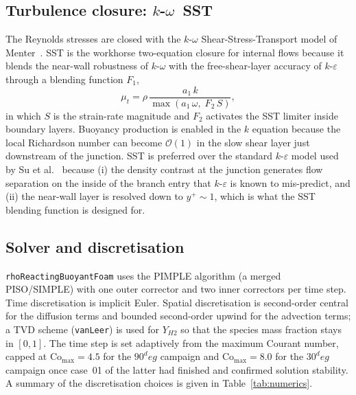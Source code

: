 \documentclass[11pt,a4paper]{article}
\def\Hi{H2}%
\def\circ{ deg}%
\newcommand{\Hi}{\ensuremath{\mathrm{H_2}}}
\begin{document}
\subsection{\texorpdfstring{Turbulence closure: $k$-$\omega$~SST}{Turbulence closure: k-omega SST}}
\label{sec:method_turb}
The Reynolds stresses are closed with the
\(k\)-\(\omega\) Shear-Stress-Transport model of
Menter~\citep{menter1994sst}. SST is the workhorse two-equation
closure for internal flows because it blends the near-wall
robustness of \(k\)-\(\omega\) with the free-shear-layer accuracy
of \(k\)-\(\varepsilon\) through a blending function \(F_1\),
\begin{equation}
\mu_t = \rho\,\frac{a_1\,k}{\max(a_1\,\omega,\;F_2\,S)},
\label{eq:mut_sst}
\end{equation}
in which \(S\) is the strain-rate magnitude and \(F_2\) activates
the SST limiter inside boundary layers. Buoyancy production is
enabled in the \(k\) equation because the local Richardson number
can become \(\mathcal{O}(1)\) in the slow shear layer just
downstream of the junction. SST is preferred over the standard
\(k\)-\(\varepsilon\) model used by Su et
al.~\citep{su2022prediction} because (i) the density contrast at
the junction generates flow separation on the inside of the branch
entry that \(k\)-\(\varepsilon\) is known to mis-predict, and
(ii) the near-wall layer is resolved down to \(y^+\sim 1\), which
is what the SST blending function is designed for.

\subsection{Solver and discretisation}
\label{sec:method_solver}
\texttt{rhoReactingBuoyantFoam} uses the PIMPLE algorithm (a merged
PISO/SIMPLE) with one outer corrector and two inner correctors per
time step. Time discretisation is implicit Euler. Spatial
discretisation is second-order central for the diffusion terms and
bounded second-order upwind for the advection terms; a TVD scheme
(\texttt{vanLeer}) is used for \(Y_{\Hi}\) so that the species mass
fraction stays in \([0,1]\). The time step is set adaptively from
the maximum Courant number, capped at
\(\mathrm{Co}_{\max} = 4.5\) for the \(90^\circ\) campaign and
\(\mathrm{Co}_{\max} = 8.0\) for the \(30^\circ\) campaign once
case~01 of the latter had finished and confirmed solution
stability. A summary of the discretisation choices is given in
Table~\ref{tab:numerics}.
\end{document}
